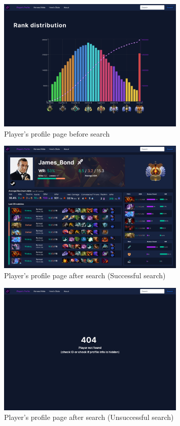     \begin{figure}[ht]
        \centering
        \includegraphics[width=0.8\textwidth]{images/PlayerProfileStartPage}
        \caption{Player's profile page before search}
        \label{fig:rankDistr}
    \end{figure}

    \begin{figure}[ht]
        \centering
        \includegraphics[width=0.8\textwidth]{images/PlayerProfile}
        \caption{Player's profile page after search (Successful search)}
    \end{figure}

    \begin{figure}[ht]
        \centering
        \includegraphics[width=0.8\textwidth]{images/PlayerNotFound}
        \caption{Player's profile page after search (Unsuccessful search)}
    \end{figure}


